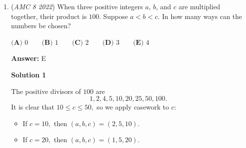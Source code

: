 \begin{enumerate}
What is the value of $(5 \, \blacklozenge \, 3) \, \bigstar \, 6?$
$\textbf{(A) } {-}20 \qquad \textbf{(B) } 4 \qquad \textbf{(C) } 16 \qquad \textbf{(D) } 100 \qquad \textbf{(E) } 220$

 \textbf{Answer: }D



\textbf{Solution 1}

We can find a general solution to any $((a \, \blacklozenge \, b) \, \bigstar \, c)$.
 \[((a \, \blacklozenge \, b) \, \bigstar \, c)\]
 \[=((a^2-b^2) \, \bigstar \, c)\]
 \[=(a^2-b^2-c)^2\]
 \[=a^4+b^4-(a^2)(b^2)-2(a^2)(c)-(b^2)(a^2)+2(b^2)(c)+c^2\]
 \[=5^4+3^4-(5^2)(3^2)-2(5^2)(6)-(3^2)(5^2)+2(3^2)(6)+6^2\]
 \[=625+81-225-300-225+108+36\]
 \[=\boxed{\textbf{(D) } 100}\]

 To time wasting

 just go to solution 2

 



\textbf{Solution 2}

The problem is basically ((5\textasciicircum{}2-3\textasciicircum{}2)-6)\textasciicircum{}2

 =(16-6)\textasciicircum{}2=10\textasciicircum{}2100 = option D

 


	\item (\textit{AMC 8 2022}) When three positive integers $a$, $b$, and $c$ are multiplied together, their product is $100$. Suppose $a < b < c$. In how many ways can the numbers be chosen?


 $\textbf{(A) } 0 \qquad \textbf{(B) } 1\qquad\textbf{(C) } 2\qquad\textbf{(D) } 3\qquad\textbf{(E) } 4$

 \textbf{Answer: }E



\textbf{Solution 1}

The positive divisors of $100$ are 
 \[1,2,4,5,10,20,25,50,100.\]It is clear that $10\leq c\leq50,$ so we apply casework to $c:$

            \begin{itemize}
        \item If $c=10,$ then $(a,b,c)=(2,5,10).$
            \end{itemize}
            
            \begin{itemize}
        \item If $c=20,$ then $(a,b,c)=(1,5,20).$
            \end{itemize}
            

\end{enumerate}
